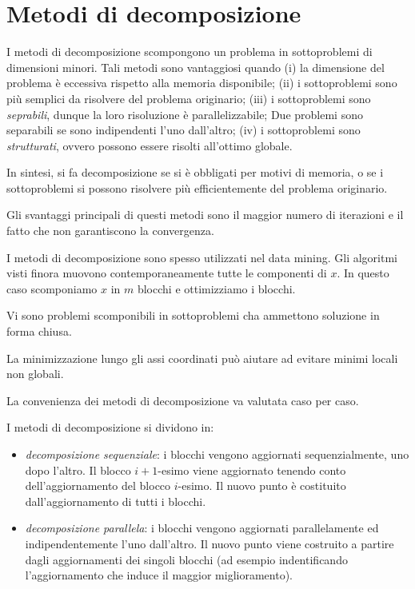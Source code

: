 \chapter{Metodi di decomposizione}
\label{chp:methods.decomposition}
I metodi di decomposizione scompongono un problema in sottoproblemi di dimensioni minori. Tali metodi sono vantaggiosi quando
(i) la dimensione del problema è eccessiva rispetto alla memoria disponibile;
(ii) i sottoproblemi sono più semplici da risolvere del problema originario;
(iii) i sottoproblemi sono \textit{seprabili}, dunque la loro risoluzione è parallelizzabile; Due problemi sono separabili se sono indipendenti l'uno dall'altro;
(iv) i sottoproblemi sono \textit{strutturati}, ovvero possono essere risolti all'ottimo globale.

In sintesi, si fa decomposizione se si è obbligati per motivi di memoria, o se i sottoproblemi si possono risolvere più efficientemente del problema originario.

Gli svantaggi principali di questi metodi sono il maggior numero di iterazioni e il fatto che non garantiscono la convergenza.

I metodi di decomposizione sono spesso utilizzati nel data mining. Gli algoritmi visti finora muovono contemporaneamente tutte le componenti di $x$. In questo caso scomponiamo $x$ in $m$ blocchi e ottimizziamo i blocchi.

Vi sono problemi scomponibili in sottoproblemi cha ammettono soluzione in forma chiusa.

La minimizzazione lungo gli assi coordinati può aiutare ad evitare minimi locali non globali.

La convenienza dei metodi di decomposizione va valutata caso per caso.

I metodi di decomposizione si dividono in:

\begin{itemize}
  \item \textit{decomposizione sequenziale}: i blocchi vengono aggiornati sequenzialmente, uno dopo l'altro. Il blocco $i+1$-esimo viene aggiornato tenendo conto dell'aggiornamento del blocco $i$-esimo. Il nuovo punto è costituito dall'aggiornamento di tutti i blocchi.

  \item \textit{decomposizione parallela}: i blocchi vengono aggiornati parallelamente ed indipendentemente l'uno dall'altro. Il nuovo punto viene costruito a partire dagli aggiornamenti dei singoli blocchi (ad esempio indentificando l'aggiornamento che induce il maggior miglioramento).
\end{itemize}

